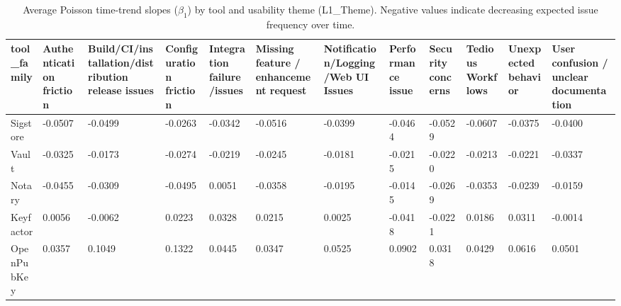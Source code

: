 \begin{table}[t]
\centering
\caption{Average Poisson time-trend slopes ($\beta_1$) by tool and usability theme (L1_Theme). Negative values indicate decreasing expected issue frequency over time.}
\label{tab:poisson-avg-beta-tool-l1-theme}
\scriptsize
\begin{tabular}{llllllllllll}
\hline
tool\_family & Authentication friction & Build/CI/installation/distribution release issues & Configuration friction & Integration failure/issues & Missing feature / enhancement request & Notification/Logging /Web UI Issues & Performance issue & Security concerns & Tedious Workflows & Unexpected behavior & User confusion / unclear documentation \\
\hline
Sigstore & -0.0507 & -0.0499 & -0.0263 & -0.0342 & -0.0516 & -0.0399 & -0.0464 & -0.0529 & -0.0607 & -0.0375 & -0.0400 \\
Vault & -0.0325 & -0.0173 & -0.0274 & -0.0219 & -0.0245 & -0.0181 & -0.0215 & -0.0220 & -0.0213 & -0.0221 & -0.0337 \\
Notary & -0.0455 & -0.0309 & -0.0495 & 0.0051 & -0.0358 & -0.0195 & -0.0145 & -0.0269 & -0.0353 & -0.0239 & -0.0159 \\
Keyfactor & 0.0056 & -0.0062 & 0.0223 & 0.0328 & 0.0215 & 0.0025 & -0.0418 & -0.0221 & 0.0186 & 0.0311 & -0.0014 \\
OpenPubKey & 0.0357 & 0.1049 & 0.1322 & 0.0445 & 0.0347 & 0.0525 & 0.0902 & 0.0318 & 0.0429 & 0.0616 & 0.0501 \\
\hline
\end{tabular}
\end{table}
